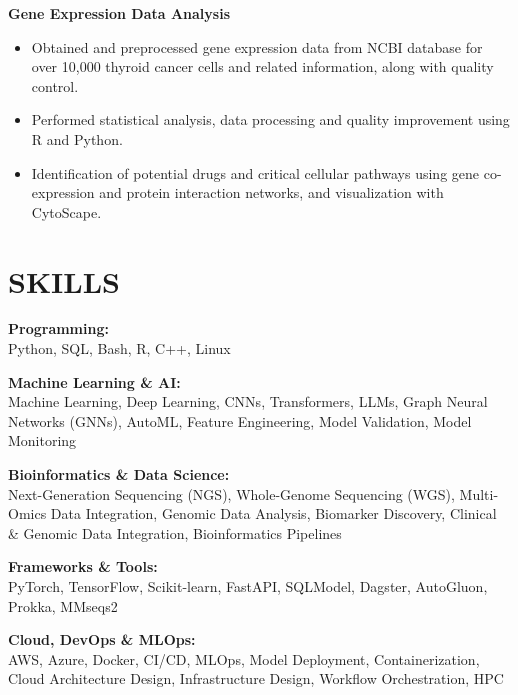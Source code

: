 \documentclass[9pt, letterpaper]{extarticle}
\begin{document}
\begin{minipage}[t]{0.64\textwidth}
\textbf{Gene Expression Data Analysis}
\small
\begin{itemize}
    \item Obtained and preprocessed gene expression data from NCBI database for over 10,000 thyroid cancer cells and related information, along with quality control.
    \item Performed statistical analysis, data processing and quality improvement using R and Python.
    \item Identification of potential drugs and critical cellular pathways using gene co-expression and protein interaction networks, and visualization with CytoScape.
\end{itemize}

\end{minipage}
\hspace{0.4cm}
\begin{minipage}[t]{0.32\textwidth}
\raggedright


\section{SKILLS}
\small

\textbf{Programming:} \\[0.025cm]
Python, SQL, Bash, R, C++, Linux

\vspace{0.08cm}
\textbf{Machine Learning \& AI:} \\[0.025cm]
Machine Learning, Deep Learning, CNNs, Transformers, LLMs, Graph Neural Networks (GNNs), AutoML, Feature Engineering, Model Validation, Model Monitoring

\vspace{0.08cm}
\textbf{Bioinformatics \& Data Science:} \\[0.025cm]
Next-Generation Sequencing (NGS), Whole-Genome Sequencing (WGS), Multi-Omics Data Integration, Genomic Data Analysis, Biomarker Discovery, Clinical \& Genomic Data Integration, Bioinformatics Pipelines

\vspace{0.08cm}
\textbf{Frameworks \& Tools:} \\[0.025cm]
PyTorch, TensorFlow, Scikit-learn, FastAPI, SQLModel, Dagster, AutoGluon, Prokka, MMseqs2

\vspace{0.08cm}
\textbf{Cloud, DevOps \& MLOps:} \\[0.025cm]
AWS, Azure, Docker, CI/CD, MLOps, Model Deployment, Containerization,  Cloud Architecture Design, Infrastructure Design, Workflow Orchestration, HPC


\end{minipage}
\end{document}
